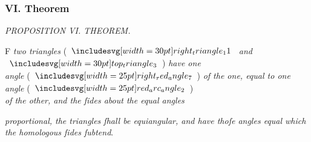 \documentclass[12pt,preview]{standalone}
\begin{document}
\subsubsection{VI. Theorem}

\begin{minipage}[t]{0.33\textwidth}
    \vspace{40pt}
    
\end{minipage}%
\hfill
\begin{minipage}[t]{0.64\textwidth}
    \vspace{0pt}

    \begin{center}
        \textit{PROPOSITION VI. THEOREM.}\label{book6pr6} \\
    \end{center}

    \hfill

    \begin{center}
        \raggedright \lettrine[lines=4, loversize=1, nindent=0pt]{}{}F \textit{two triangles} (\hspace{-1ex}$\img[0][0][30]{right_triangle_11}$ \textit{and} $\img[0][0][30]{top_triangle_3}$\hspace{-1ex}) \textit{have one\\ angle} (\hspace{-1ex}$\img{right_red_angle_7}$\hspace{-1ex}) \textit{of the one, equal to one angle} (\hspace{-1ex}$\img{red_arc_angle_2}$\hspace{-1ex})\\ \textit{of the other, and the ſides about the equal angles}
    \end{center}
    \raggedright \textit{proportional, the triangles ſhall be equiangular, and have thoſe angles equal which the homologous ſides ſubtend}.

    \hfill

    \hfill


\end{minipage}
\end{document}
